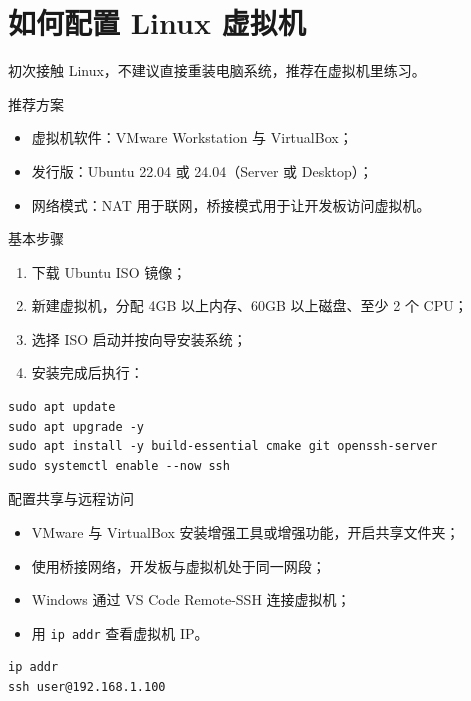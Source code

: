 \section{如何配置 Linux 虚拟机}

初次接触 Linux，不建议直接重装电脑系统，推荐在虚拟机里练习。

\begin{anybox}{推荐方案}

\begin{itemize}
\item 虚拟机软件：VMware Workstation 与 VirtualBox；
\item 发行版：Ubuntu 22.04 或 24.04（Server 或 Desktop）；
\item 网络模式：NAT 用于联网，桥接模式用于让开发板访问虚拟机。
\end{itemize}

\end{anybox}
\begin{anybox}{基本步骤}
\begin{enumerate}
\item 下载 Ubuntu ISO 镜像；
\item 新建虚拟机，分配 4GB 以上内存、60GB 以上磁盘、至少 2 个 CPU；
\item 选择 ISO 启动并按向导安装系统；
\item 安装完成后执行：
\end{enumerate}
\end{anybox}

\begin{lstlisting}
sudo apt update
sudo apt upgrade -y
sudo apt install -y build-essential cmake git openssh-server
sudo systemctl enable --now ssh
\end{lstlisting}
\begin{anybox}{配置共享与远程访问}
\begin{itemize}
\item VMware 与 VirtualBox 安装增强工具或增强功能，开启共享文件夹；
\item 使用桥接网络，开发板与虚拟机处于同一网段；
\item Windows 通过 VS Code Remote-SSH 连接虚拟机；
\item 用 \texttt{ip addr} 查看虚拟机 IP。
\end{itemize}
\end{anybox}

\begin{lstlisting}
ip addr
ssh user@192.168.1.100
\end{lstlisting}


